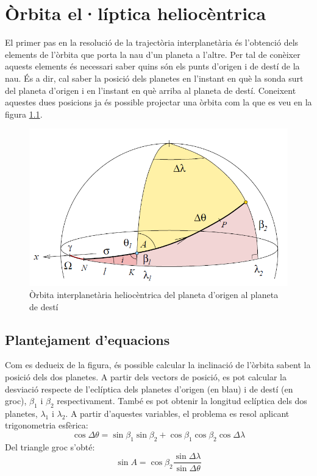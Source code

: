 \chapter{Òrbita el·líptica heliocèntrica}

El primer pas en la resolució de la trajectòria interplanetària és l'obtenció dels elements de l'òrbita que porta la nau d'un planeta a l'altre. Per tal de conèixer aquests elements és necessari saber quins són els punts d'origen i de destí de la nau. És a dir, cal saber la posició dels planetes en l'instant en què la sonda surt del planeta d'origen i en l'instant en què arriba al planeta de destí. Coneixent aquestes dues posicions ja és possible projectar una òrbita com la que es veu en la figura \ref{esquema_orb}.

\begin{figure}[H]
	\centering
	\includegraphics[scale=0.7]{./plots/esquema_orbi}
	\caption{Òrbita interplanetària heliocèntrica del planeta d'origen al planeta de destí}
	\label{esquema_orb}
\end{figure}

\section{Plantejament d'equacions}
Com es dedueix de la figura, és possible calcular la inclinació de l'òrbita sabent la posició dels dos planetes. A partir dels vectors de posició, es pot calcular la desviació respecte de l'eclíptica dels planetes d'origen (en blau) i de destí (en groc), $\beta_{1}$ i $\beta_{2}$ respectivament. També es pot obtenir la longitud eclíptica dels dos planetes, $\lambda_{1}$ i $\lambda_{2}$. A partir d'aquestes variables, el problema es resol aplicant trigonometria esfèrica:
\begin{equation}
\cos\Delta\theta=\sin\beta_{1}\sin\beta_{2}+\cos\beta_{1}\cos\beta_{2}\cos\Delta\lambda
\end{equation}
Del triangle groc s'obté:
\begin{equation}
\sin A=\cos\beta_{2}\frac{\sin\Delta\lambda}{\sin\Delta\theta}
\end{equation}

